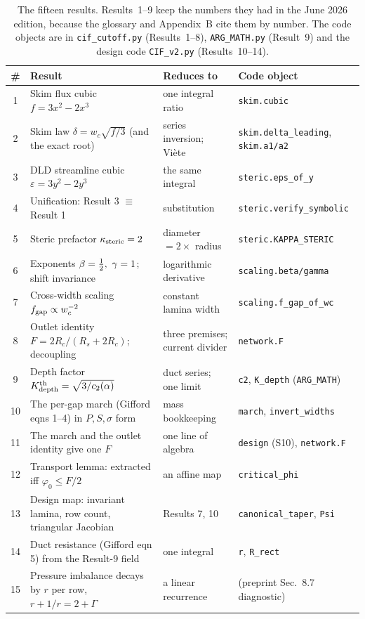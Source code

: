 \begin{table}[ht]
\centering
\small
\begin{tabular}{@{}cp{5.5cm}p{3.3cm}>{\raggedright\arraybackslash}p{4.4cm}@{}}
\toprule
\# & Result & Reduces to & Code object \\
\midrule
1 & Skim flux cubic $f = 3x^2 - 2x^3$ & one integral ratio & \texttt{skim.cubic} \\
2 & Skim law $\delta = w_c\sqrt{f/3}$ (and the exact root) & series inversion; Vi\`ete & \texttt{skim.delta\_leading}, \texttt{skim.a1/a2} \\
3 & DLD streamline cubic $\varepsilon = 3y^2 - 2y^3$ & the same integral & \texttt{steric.eps\_of\_y} \\
4 & Unification: Result 3 $\equiv$ Result 1 & substitution & \texttt{steric.verify\_symbolic} \\
5 & Steric prefactor $\kappa_{\mathrm{steric}} = 2$ & diameter $= 2\times$ radius & \texttt{steric.KAPPA\_STERIC} \\
6 & Exponents $\beta=\tfrac{1}{2},\ \gamma=1$; shift invariance & logarithmic derivative & \texttt{scaling.beta/gamma} \\
7 & Cross-width scaling $f_{\mathrm{gap}} \propto w_c^{-2}$ & constant lamina width & \texttt{scaling.f\_gap\_of\_wc} \\
8 & Outlet identity $F = 2R_c/(R_s+2R_c)$; decoupling & three premises; current divider & \texttt{network.F} \\
9 & Depth factor $K_{\mathrm{depth}}^{\mathrm{th}}=\sqrt{3/c_2(\alpha)}$ & duct series; one limit & \texttt{c2}, \texttt{K\_depth} (\texttt{ARG\_MATH}) \\
\midrule
10 & The per-gap march (Gifford eqns 1--4) in $P,S,\sigma$ form & mass bookkeeping & \texttt{march}, \texttt{invert\_widths} \\
11 & The march and the outlet identity give one $F$ & one line of algebra & \texttt{design} (S10), \texttt{network.F} \\
12 & Transport lemma: extracted iff $\varphi_0\le F/2$ & an affine map & \texttt{critical\_phi} \\
13 & Design map: invariant lamina, row count, triangular Jacobian & Results 7, 10 & \texttt{canonical\_taper}, \texttt{Psi} \\
14 & Duct resistance (Gifford eqn 5) from the Result-9 field & one integral & \texttt{r}, \texttt{R\_rect} \\
15 & Pressure imbalance decays by $r$ per row, $r+1/r=2+\Gamma$ & a linear recurrence & (preprint Sec.~8.7 diagnostic) \\
\bottomrule
\end{tabular}
\caption{The fifteen results. Results~1--9 keep the numbers they had in the June 2026
edition, because the glossary and Appendix~B cite them by number. The code objects are in
\texttt{cif\_cutoff.py} (Results~1--8), \texttt{ARG\_MATH.py} (Result~9) and the design code
\texttt{CIF\_v2.py} (Results~10--14).}
\label{tab:inventory}
\end{table}

